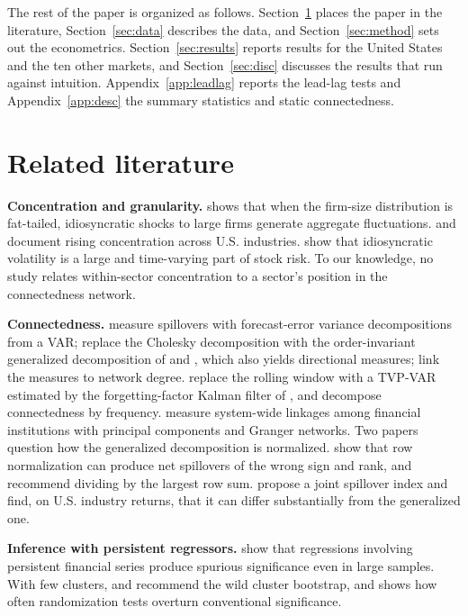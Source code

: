 \documentclass[11pt]{article}
\begin{document}
The rest of the paper is organized as follows. Section~\ref{sec:lit} places the paper in the literature, Section~\ref{sec:data} describes the data, and Section~\ref{sec:method} sets out the econometrics. Section~\ref{sec:results} reports results for the United States and the ten other markets, and Section~\ref{sec:disc} discusses the results that run against intuition. Appendix~\ref{app:leadlag} reports the lead-lag tests and Appendix~\ref{app:desc} the summary statistics and static connectedness.

\section{Related literature}\label{sec:lit}

\textbf{Concentration and granularity.} \citet{gabaix2011} shows that when the firm-size distribution is fat-tailed, idiosyncratic shocks to large firms generate aggregate fluctuations. \citet{grullon2019} and \citet{kwon2024} document rising concentration across U.S. industries. \citet{campbell2001} show that idiosyncratic volatility is a large and time-varying part of stock risk. To our knowledge, no study relates within-sector concentration to a sector's position in the connectedness network.

\textbf{Connectedness.} \citet{diebold2009} measure spillovers with forecast-error variance decompositions from a VAR; \citet{diebold2012} replace the Cholesky decomposition with the order-invariant generalized decomposition of \citet{koop1996} and \citet{pesaran1998}, which also yields directional measures; \citet{diebold2014} link the measures to network degree. \citet{antonakakis2020} replace the rolling window with a TVP-VAR estimated by the forgetting-factor Kalman filter of \citet{koop2013}, and \citet{barunik2018} decompose connectedness by frequency. \citet{billio2012} measure system-wide linkages among financial institutions with principal components and Granger networks. Two papers question how the generalized decomposition is normalized. \citet{caloia2019} show that row normalization can produce net spillovers of the wrong sign and rank, and recommend dividing by the largest row sum. \citet{lastrapes2021} propose a joint spillover index and find, on U.S. industry returns, that it can differ substantially from the generalized one.

\textbf{Inference with persistent regressors.} \citet{ferson2003} show that regressions involving persistent financial series produce spurious significance even in large samples. With few clusters, \citet{cameron2008} and \citet{webb2023} recommend the wild cluster bootstrap, and \citet{young2019} shows how often randomization tests overturn conventional significance.
\end{document}
